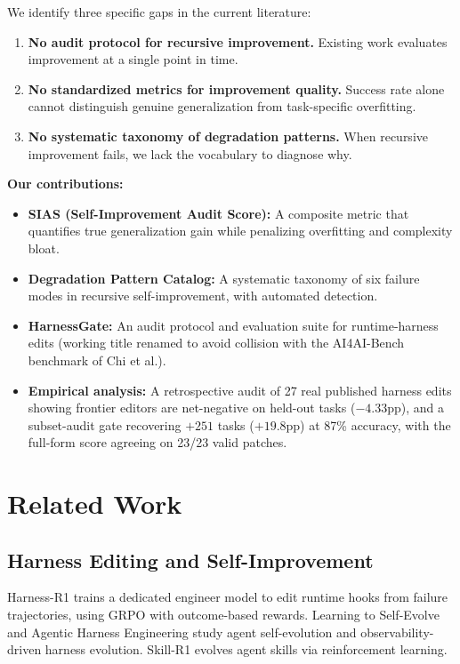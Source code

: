 \documentclass{article}
\begin{document}
We identify three specific gaps in the current literature:

\begin{enumerate}
    \item \textbf{No audit protocol for recursive improvement.} Existing work evaluates improvement at a single point in time.
    \item \textbf{No standardized metrics for improvement quality.} Success rate alone cannot distinguish genuine generalization from task-specific overfitting.
    \item \textbf{No systematic taxonomy of degradation patterns.} When recursive improvement fails, we lack the vocabulary to diagnose why.
\end{enumerate}

\textbf{Our contributions:}
\begin{itemize}
    \item \textbf{SIAS (Self-Improvement Audit Score):} A composite metric that quantifies true generalization gain while penalizing overfitting and complexity bloat.
    \item \textbf{Degradation Pattern Catalog:} A systematic taxonomy of six failure modes in recursive self-improvement, with automated detection.
    \item \textbf{HarnessGate:} An audit protocol and evaluation suite for runtime-harness edits (working title renamed to avoid collision with the AI4AI-Bench benchmark of Chi et al.).
    \item \textbf{Empirical analysis:} A retrospective audit of 27 real published harness edits showing frontier editors are net-negative on held-out tasks ($-4.33$pp), and a subset-audit gate recovering $+251$ tasks ($+19.8$pp) at 87\% accuracy, with the full-form score agreeing on 23/23 valid patches.
\end{itemize}

\section{Related Work}
\label{sec:related}

\subsection{Harness Editing and Self-Improvement}
Harness-R1 \citep{shao2026harnessr1} trains a dedicated engineer model to edit runtime hooks from failure trajectories, using GRPO \citep{deepseek2025grpo} with outcome-based rewards. Learning to Self-Evolve \citep{chen2026selfevolve} and Agentic Harness Engineering \citep{agentic2026harness} study agent self-evolution and observability-driven harness evolution. Skill-R1 \citep{vishe2026skillr1} evolves agent skills via reinforcement learning.
\end{document}
